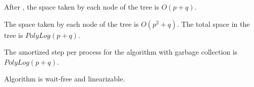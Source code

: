 \begin{lemma}
    After , the space taken by each node of the tree is $O(p+q)$.
\end{lemma}

\begin{corollary}
The space taken by each node of the tree is $O(p^2+q)$. The total space in the tree is $PolyLog(p+q)$.
\end{corollary}

\begin{lemma}
  The amortized step per process for the algorithm with garbage collection is $PolyLog(p+q)$.
\end{lemma}

\begin{lemma}
  Algorithm is wait-free and linearizable.
\end{lemma}

